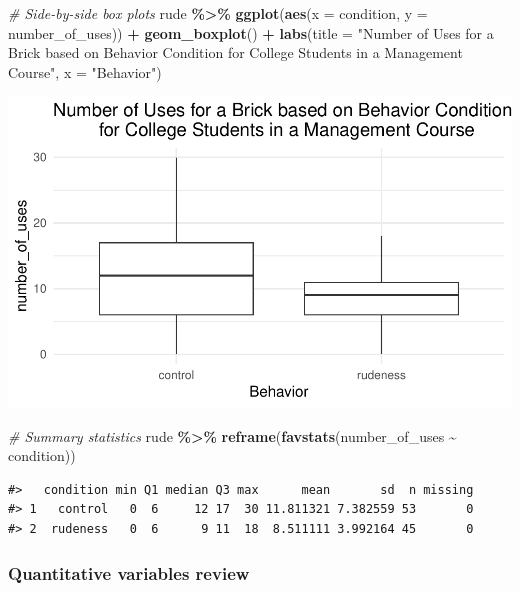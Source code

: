\documentclass[
]{report}
\newenvironment{Shaded}{\begin{snugshade}}{\end{snugshade}}
\newcommand{\AttributeTok}[1]{\textcolor[rgb]{0.13,0.29,0.53}{#1}}
\newcommand{\CommentTok}[1]{\textcolor[rgb]{0.56,0.35,0.01}{\textit{#1}}}
\newcommand{\FunctionTok}[1]{\textcolor[rgb]{0.13,0.29,0.53}{\textbf{#1}}}
\newcommand{\NormalTok}[1]{#1}
\newcommand{\SpecialCharTok}[1]{\textcolor[rgb]{0.81,0.36,0.00}{\textbf{#1}}}
\newcommand{\StringTok}[1]{\textcolor[rgb]{0.31,0.60,0.02}{#1}}
\begin{document}
\newpage

\begin{Shaded}
\begin{Highlighting}[]
\CommentTok{\# Side{-}by{-}side box plots}
\NormalTok{rude }\SpecialCharTok{\%\textgreater{}\%}
\FunctionTok{ggplot}\NormalTok{(}\FunctionTok{aes}\NormalTok{(}\AttributeTok{x =}\NormalTok{ condition, }\AttributeTok{y =}\NormalTok{ number\_of\_uses)) }\SpecialCharTok{+}
    \FunctionTok{geom\_boxplot}\NormalTok{() }\SpecialCharTok{+} 
    \FunctionTok{labs}\NormalTok{(}\AttributeTok{title =} \StringTok{"Number of Uses for a Brick based on Behavior Condition}
\StringTok{         for College Students in a Management Course"}\NormalTok{,}
         \AttributeTok{x =} \StringTok{"Behavior"}\NormalTok{) }
\end{Highlighting}
\end{Shaded}

\begin{center}\includegraphics[width=0.6\linewidth]{12-A24-inference-1ofeach-simulation_files/figure-latex/unnamed-chunk-2-1} \end{center}

\begin{Shaded}
\begin{Highlighting}[]
\CommentTok{\# Summary statistics}
\NormalTok{rude }\SpecialCharTok{\%\textgreater{}\%} 
     \FunctionTok{reframe}\NormalTok{(}\FunctionTok{favstats}\NormalTok{(number\_of\_uses }\SpecialCharTok{\textasciitilde{}}\NormalTok{ condition))}
\end{Highlighting}
\end{Shaded}

\begin{verbatim}
#>   condition min Q1 median Q3 max      mean       sd  n missing
#> 1   control   0  6     12 17  30 11.811321 7.382559 53       0
#> 2  rudeness   0  6      9 11  18  8.511111 3.992164 45       0
\end{verbatim}

\subsubsection*{Quantitative variables review}\label{quantitative-variables-review}
\end{document}
